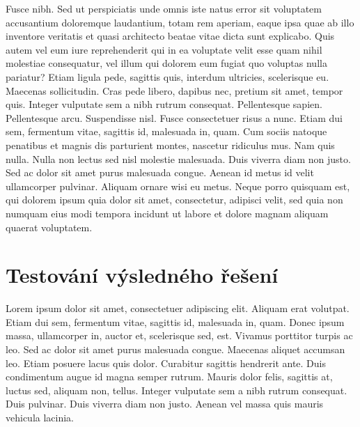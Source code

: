 \documentclass[czech,master,dept460,male,cpp,cpdeclaration]{diploma}
\begin{document}
Fusce nibh. Sed ut perspiciatis unde omnis iste natus error sit voluptatem accusantium doloremque laudantium, totam rem aperiam, eaque ipsa quae ab illo inventore veritatis et quasi architecto beatae vitae dicta sunt explicabo. Quis autem vel eum iure reprehenderit qui in ea voluptate velit esse quam nihil molestiae consequatur, vel illum qui dolorem eum fugiat quo voluptas nulla pariatur? Etiam ligula pede, sagittis quis, interdum ultricies, scelerisque eu. Maecenas sollicitudin. Cras pede libero, dapibus nec, pretium sit amet, tempor quis. Integer vulputate sem a nibh rutrum consequat. Pellentesque sapien. Pellentesque arcu. Suspendisse nisl. Fusce consectetuer risus a nunc. Etiam dui sem, fermentum vitae, sagittis id, malesuada in, quam. Cum sociis natoque penatibus et magnis dis parturient montes, nascetur ridiculus mus. Nam quis nulla. Nulla non lectus sed nisl molestie malesuada. Duis viverra diam non justo. Sed ac dolor sit amet purus malesuada congue. Aenean id metus id velit ullamcorper pulvinar. Aliquam ornare wisi eu metus. Neque porro quisquam est, qui dolorem ipsum quia dolor sit amet, consectetur, adipisci velit, sed quia non numquam eius modi tempora incidunt ut labore et dolore magnam aliquam quaerat voluptatem.


\section{Testování výsledného řešení}
Lorem ipsum dolor sit amet, consectetuer adipiscing elit. Aliquam erat volutpat. Etiam dui sem, fermentum vitae, sagittis id, malesuada in, quam. Donec ipsum massa, ullamcorper in, auctor et, scelerisque sed, est. Vivamus porttitor turpis ac leo. Sed ac dolor sit amet purus malesuada congue. Maecenas aliquet accumsan leo. Etiam posuere lacus quis dolor. Curabitur sagittis hendrerit ante. Duis condimentum augue id magna semper rutrum. Mauris dolor felis, sagittis at, luctus sed, aliquam non, tellus. Integer vulputate sem a nibh rutrum consequat. Duis pulvinar. Duis viverra diam non justo. Aenean vel massa quis mauris vehicula lacinia.
\end{document}
